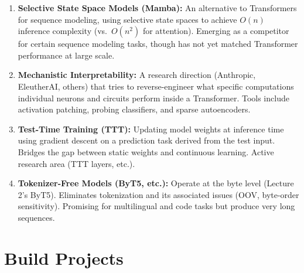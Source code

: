 \documentclass[11pt, a4paper]{article}
\begin{document}
\begin{enumerate}[leftmargin=2em]
  \item \textbf{Selective State Space Models (Mamba):} An alternative to Transformers for sequence modeling, using selective state spaces to achieve $O(n)$ inference complexity (vs.\ $O(n^2)$ for attention). Emerging as a competitor for certain sequence modeling tasks, though has not yet matched Transformer performance at large scale.

  \item \textbf{Mechanistic Interpretability:} A research direction (Anthropic, EleutherAI, others) that tries to reverse-engineer what specific computations individual neurons and circuits perform inside a Transformer. Tools include activation patching, probing classifiers, and sparse autoencoders.

  \item \textbf{Test-Time Training (TTT):} Updating model weights at inference time using gradient descent on a prediction task derived from the test input. Bridges the gap between static weights and continuous learning. Active research area (TTT layers, etc.).

  \item \textbf{Tokenizer-Free Models (ByT5, etc.):} Operate at the byte level (Lecture 2's ByT5). Eliminates tokenization and its associated issues (OOV, byte-order sensitivity). Promising for multilingual and code tasks but produce very long sequences.
\end{enumerate}

\newpage
\section{Build Projects}
\end{document}
